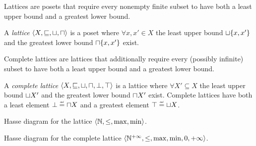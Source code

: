 Lattices are posets that require every nonempty finite subset to have both a least upper bound and a greatest lower bound.

\begin{definition}[Lattice]
  A \emph{lattice} $\langle X, \sqsubseteq, \sqcup, \sqcap \rangle$ is a poset where $\forall x, x'\in X$ the least upper bound $\sqcup\{x, x'\}$ and the greatest lower bound $\sqcap\{x, x'\}$ exist.
\end{definition}

Complete lattices are lattices that additionally require every (possibly infinite) subset to have both a least upper bound and a greatest lower bound.

\begin{definition}
  A \emph{complete lattice} $\langle X, \sqsubseteq, \sqcup, \sqcap, \bot, \top \rangle$ is a lattice where $\forall X' \subseteq X$ the least upper bound $\sqcup X'$ and the greatest lower bound $\sqcap X'$ exist.
  Complete lattices have both a least element $\bot \defeq \meet X$ and a greatest element $\top \defeq \join X$.
\end{definition}

\begin{marginfigure}
  \centering
  \caption{Hasse diagram for the lattice $\langle \mathbb{N}, \le, \max, \min \rangle$.}
  \end{marginfigure}

\begin{marginfigure}
  \centering
  \caption{Hasse diagram for the complete lattice $\langle \mathbb{N}^{+\infty}, \le, \max, \min, 0, +\infty \rangle$.}
  \end{marginfigure}


